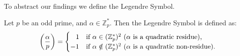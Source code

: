 \newpage
\noindent
To abstract our findings we define the Legendre Symbol.
\begin{Func}

    Let $p$ be an odd prime, and $\alpha\in\mathbb{Z}_p^*$. Then the Legendre Symbol is defined as:
    \[
    \left(\frac{\alpha}{p}\right) = \begin{cases}
        \hspace{.8em}1 & \text{if } \alpha\in(\mathbb{Z}_p^*)^2\text{ ($\alpha$ is a quadratic residue),}\\
        -1 & \text{if } \alpha\notin(\mathbb{Z}_p^*)^2\text{ ($\alpha$ is a quadratic non-residue).}\\
    \end{cases}
    \]
\end{Func}